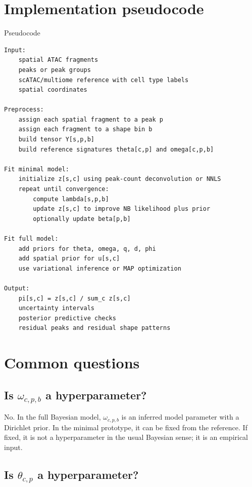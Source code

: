 \documentclass[11pt]{article}
\begin{document}
\section{Implementation pseudocode}

\begin{plainbox}{Pseudocode}
\begin{verbatim}
Input:
    spatial ATAC fragments
    peaks or peak groups
    scATAC/multiome reference with cell type labels
    spatial coordinates

Preprocess:
    assign each spatial fragment to a peak p
    assign each fragment to a shape bin b
    build tensor Y[s,p,b]
    build reference signatures theta[c,p] and omega[c,p,b]

Fit minimal model:
    initialize z[s,c] using peak-count deconvolution or NNLS
    repeat until convergence:
        compute lambda[s,p,b]
        update z[s,c] to improve NB likelihood plus prior
        optionally update beta[p,b]

Fit full model:
    add priors for theta, omega, q, d, phi
    add spatial prior for u[s,c]
    use variational inference or MAP optimization

Output:
    pi[s,c] = z[s,c] / sum_c z[s,c]
    uncertainty intervals
    posterior predictive checks
    residual peaks and residual shape patterns
\end{verbatim}
\end{plainbox}

\section{Common questions}

\subsection{Is \texorpdfstring{\(\omega_{c,p,b}\)}{omega} a hyperparameter?}

No.  In the full Bayesian model, \(\omega_{c,p,b}\) is an inferred model parameter with a Dirichlet prior.  In the minimal prototype, it can be fixed from the reference.  If fixed, it is not a hyperparameter in the usual Bayesian sense; it is an empirical input.

\subsection{Is \texorpdfstring{\(\theta_{c,p}\)}{theta} a hyperparameter?}
\end{document}
